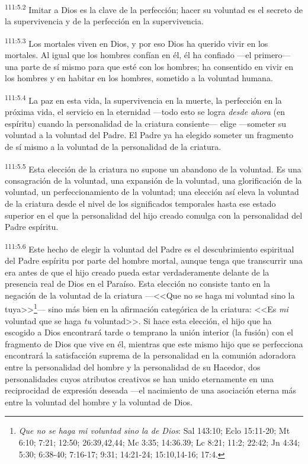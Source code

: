 \par
\textsuperscript{111:5.2} Imitar a Dios es la clave de la perfección; hacer su voluntad es el secreto de la supervivencia y de la perfección en la supervivencia.

\par
\textsuperscript{111:5.3} Los mortales viven en Dios, y por eso Dios ha querido vivir en los mortales. Al igual que los hombres confían en él, él ha confiado ---el primero--- una parte de sí mismo para que esté con los hombres; ha consentido en vivir en los hombres y en habitar en los hombres, sometido a la voluntad humana.

\par
\textsuperscript{111:5.4} La paz en esta vida, la supervivencia en la muerte, la perfección en la próxima vida, el servicio en la eternidad ---todo esto se logra \textit{desde ahora} (en espíritu) cuando la personalidad de la criatura consiente--- elige ---someter su voluntad a la voluntad del Padre. El Padre ya ha elegido someter un fragmento de sí mismo a la voluntad de la personalidad de la criatura.

\par
\textsuperscript{111:5.5} Esta elección de la criatura no supone un abandono de la voluntad. Es una consagración de la voluntad, una expansión de la voluntad, una glorificación de la voluntad, un perfeccionamiento de la voluntad; una elección así eleva la voluntad de la criatura desde el nivel de los significados temporales hasta ese estado superior en el que la personalidad del hijo creado comulga con la personalidad del Padre espíritu.

\par
\textsuperscript{111:5.6} Este hecho de elegir la voluntad del Padre es el descubrimiento espiritual del Padre espíritu por parte del hombre mortal, aunque tenga que transcurrir una era antes de que el hijo creado pueda estar verdaderamente delante de la presencia real de Dios en el Paraíso. Esta elección no consiste tanto en la negación de la voluntad de la criatura ---<<Que no se haga mi voluntad sino la tuya>>\footnote{\textit{Que no se haga mi voluntad sino la de Dios}: Sal 143:10; Eclo 15:11-20; Mt 6:10; 7:21; 12:50; 26:39,42,44; Mc 3:35; 14:36.39; Lc 8:21; 11:2; 22:42; Jn 4:34; 5:30; 6:38-40; 7:16-17; 9:31; 14:21-24; 15:10,14-16; 17:4.}--- sino más bien en la afirmación categórica de la criatura: <<Es \textit{mi} voluntad que se haga \textit{tu} voluntad>>. Si hace esta elección, el hijo que ha escogido a Dios encontrará tarde o temprano la unión interior (la fusión) con el fragmento de Dios que vive en él, mientras que este mismo hijo que se perfecciona encontrará la satisfacción suprema de la personalidad en la comunión adoradora entre la personalidad del hombre y la personalidad de su Hacedor, dos personalidades cuyos atributos creativos se han unido eternamente en una reciprocidad de expresión deseada ---el nacimiento de una asociación eterna más entre la voluntad del hombre y la voluntad de Dios.

